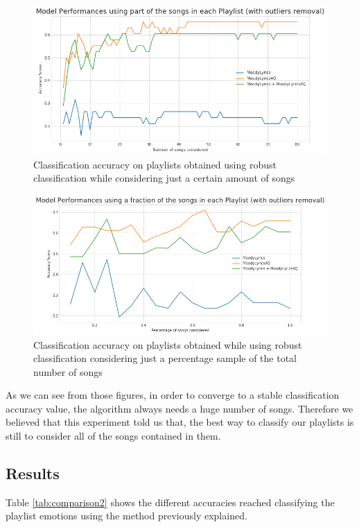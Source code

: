\begin{figure}[H]
\centering
\includegraphics[width=1\textwidth]{./chapters/chapter5/images/subset-absolute-robust}
\caption{Classification accuracy on playlists obtained using robust classification while considering just a certain amount of songs}
\label{fig:subset-absolute-robust}
\end{figure}

\begin{figure}[H]
\centering
\includegraphics[width=1\textwidth]{./chapters/chapter5/images/subset-percentage-robust}
\caption{Classification accuracy on playlists obtained while using robust classification considering just a percentage sample of the total number of songs}
\label{fig:subset-percentage-robust}
\end{figure}

As we can see from those figures, in order to converge to a stable classification accuracy value, the algorithm always needs a huge number of songs. Therefore we believed that this experiment told us that, the best way to classify our playlists is still to consider all of the songs contained in them.

\subsection{Results}
Table \ref{tab:comparison2} shows the different accuracies reached classifying the playlist emotions using the method previously explained. 


